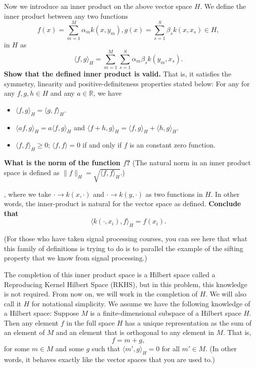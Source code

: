 \begin{Parts}
\Part Now we introduce an inner product on the above vector space $H$. We define the inner product between any two functions 
$$f(x)=\sum_{m=1}^M\alpha_m k(x,y_m),g(x)=\sum_{s=1}^S\beta_s k(x,x_s)\in H,$$ 
in $H$ as
\begin{equation}
\langle f,g \rangle_H = \sum_{m=1}^M\sum_{s=1}^S\alpha_m\beta_s k(y_m,x_s).
\end{equation}
{\bf Show that the defined inner product is valid.} That is, it satisfies the symmetry, linearity and positive-definiteness properties stated below: For any for any $f,g, h\in H$ and any $a\in \mathbb R$, we have
\begin{itemize}
  \item $\langle f,g \rangle_H= \langle g,f \rangle_H$. 
  \item $\langle af,g \rangle_H = a\langle f,g \rangle_H$ and $\langle f+h,g \rangle_H = \langle f,g \rangle_H + \langle h,g \rangle_H$.
  \item $\langle f,f \rangle_H\geq 0$; $\langle f,f\rangle =0$ if and only if $f$ is an constant zero function. 
\end{itemize}

{\bf What is the norm of the function $f$?} (The natural norm in an inner product space is defined as $\|f\|_H=\sqrt {\langle f,f \rangle_H }$.)



, where we
take $\cdot\to k(x,\cdot)$ and $\cdot\to k(y,\cdot)$ as two functions
in $H$. In other words, the inner-product is natural for the vector
space as defined. {\bf Conclude that }
\begin{equation}
\langle k(\cdot, x_i),f \rangle_H = f(x_i). 
\end{equation}

(For those who have taken signal processing courses, you can see here
that what this family of definitions is trying to do is to parallel
the example of the sifting property that we know from signal processing.) 
 

\Part The completion of this inner product space is a Hilbert space
called a Reproducing Kernel Hilbert Space (RKHS), but in this problem,
this knowledge is not required. From now on, we will work in the
completion of $H$. We will also call it $H$ for notational
simplicity. We assume we have the following knowledge of a Hilbert
space: Suppose $M$ is a finite-dimensional subspace of a Hilbert space
$H$. Then any element $f$ in the full space $H$ has a unique representation as the sum of an element of $M$ and an element that is orthogonal to any element in $M$. That is, 
\begin{equation}
f = m + g,
\end{equation}
for some $m\in M$ and some $g$ such that $\langle m',g\rangle_H=0$ for
all $m'\in M$. (In other words, it behaves exactly like the vector spaces that
you are used to.)


\end{Parts}
